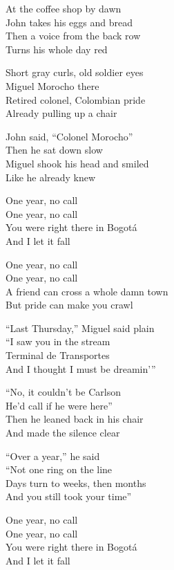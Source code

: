 \begin{lyrics}
At the coffee shop by dawn\\
John takes his eggs and bread\\
Then a voice from the back row\\
Turns his whole day red

Short gray curls, old soldier eyes\\
Miguel Morocho there\\
Retired colonel, Colombian pride\\
Already pulling up a chair

John said, “Colonel Morocho”\\
Then he sat down slow\\
Miguel shook his head and smiled\\
Like he already knew

One year, no call\\
One year, no call\\
You were right there in Bogotá\\
And I let it fall

One year, no call\\
One year, no call\\
A friend can cross a whole damn town\\
But pride can make you crawl

“Last Thursday,” Miguel said plain\\
“I saw you in the stream\\
Terminal de Transportes\\
And I thought I must be dreamin’”

“No, it couldn’t be Carlson\\
He’d call if he were here”\\
Then he leaned back in his chair\\
And made the silence clear

“Over a year,” he said\\
“Not one ring on the line\\
Days turn to weeks, then months\\
And you still took your time”

One year, no call\\
One year, no call\\
You were right there in Bogotá\\
And I let it fall


\end{lyrics}
